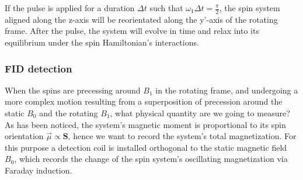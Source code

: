 \documentclass[11.5pt,a4paper]{article}
\begin{document}
If the pulse is applied for a duration $\Delta t$ such that $\omega_1 \Delta t = \tfrac{\pi}{2}$, the spin system aligned along the z-axis will be reorientated along the y'-axis of the rotating frame. After the pulse, the system will evolve in time and relax into its equilibrium under the spin Hamiltonian's interactions. 

\subsubsection{FID detection}
When the spins are precessing around $B_1$ in the rotating frame, and undergoing a more complex motion resulting from a superposition of precession around the static $B_0$ and the rotating $B_1$, what physical quantity are we going to measure? As has been noticed, the system's magnetic moment is proportional to its spin orientation $\vec{\mu} \propto \mathbf{S}$, hence we want to record the system's total magnetization. For this purpose a detection coil is installed orthogonal to the static magnetic field $B_0$, which records the change of the spin system's oscillating magnetization via Faraday induction.
\end{document}

